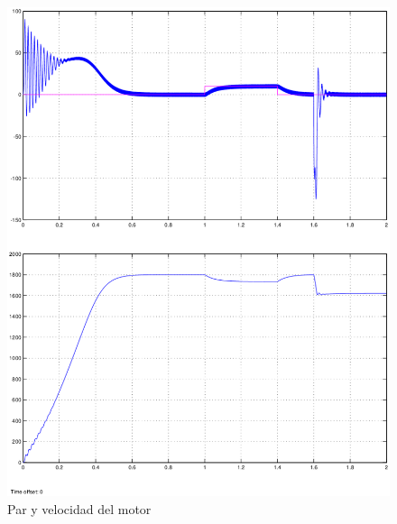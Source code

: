 \documentclass[11pt, a4paper]{article}
\begin{document}
\begin{figure}[H]
\centering
\includegraphics[scale=0.8]{imagenes/parvel}
\caption{Par y velocidad del motor}
\label{parvel}
\end{figure}
\end{document}
